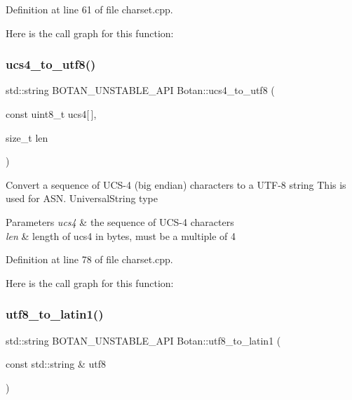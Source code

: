 Definition at line 61 of file charset.\+cpp.

Here is the call graph for this function\+:
\mbox{\label{namespace_botan_a2bb4359def9a750e534e6ece252bd319}} 
\subsubsection{\texorpdfstring{ucs4\+\_\+to\+\_\+utf8()}{ucs4\_to\_utf8()}}
{\footnotesize\ttfamily std\+::string B\+O\+T\+A\+N\+\_\+\+U\+N\+S\+T\+A\+B\+L\+E\+\_\+\+A\+PI Botan\+::ucs4\+\_\+to\+\_\+utf8 (\begin{DoxyParamCaption}\item[{const uint8\+\_\+t}]{ucs4\mbox{[}$\,$\mbox{]},  }\item[{size\+\_\+t}]{len }\end{DoxyParamCaption})}

Convert a sequence of U\+C\+S-\/4 (big endian) characters to a U\+T\+F-\/8 string This is used for A\+S\+N. Universal\+String type 
\begin{DoxyParams}{Parameters}
{\em ucs4} & the sequence of U\+C\+S-\/4 characters \\
\hline
{\em len} & length of ucs4 in bytes, must be a multiple of 4 \\
\hline
\end{DoxyParams}


Definition at line 78 of file charset.\+cpp.

Here is the call graph for this function\+:
\mbox{\label{namespace_botan_a590c935190a5568639820d98a911f7cd}} 
\subsubsection{\texorpdfstring{utf8\+\_\+to\+\_\+latin1()}{utf8\_to\_latin1()}}
{\footnotesize\ttfamily std\+::string B\+O\+T\+A\+N\+\_\+\+U\+N\+S\+T\+A\+B\+L\+E\+\_\+\+A\+PI Botan\+::utf8\+\_\+to\+\_\+latin1 (\begin{DoxyParamCaption}\item[{const std\+::string \&}]{utf8 }\end{DoxyParamCaption})}

